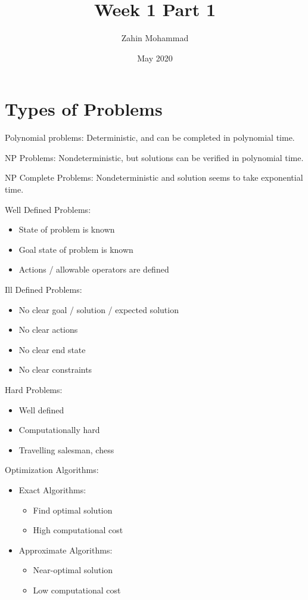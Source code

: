 \documentclass{article}
\title{Week 1 Part 1}
\author{Zahin Mohammad}
\date{May 2020}
\begin{document}
\maketitle

\section{Types of Problems}
Polynomial problems: Deterministic, and can be completed in polynomial time.
\setlength{\parskip}{6pt}

NP Problems: Nondeterministic, but solutions can be verified in polynomial time.
\setlength{\parskip}{6pt}

NP Complete Problems: Nondeterministic and solution seems to take exponential time.
\setlength{\parskip}{6pt}

Well Defined Problems:
\begin{itemize}
    \item State of problem is known
    \item Goal state of problem is known
    \item Actions / allowable operators are defined
\end{itemize}

Ill Defined Problems:
\begin{itemize}
    \item No clear goal / solution / expected solution
    \item No clear actions
    \item No clear end state
    \item No clear constraints
\end{itemize}

Hard Problems:
\begin{itemize}
    \item Well defined
    \item Computationally hard
    \item Travelling salesman, chess
\end{itemize}

Optimization Algorithms:
\begin{itemize}
    \item Exact Algorithms:
    \begin{itemize}
        \item Find optimal solution
        \item High computational cost
    \end{itemize}
    \item Approximate Algorithms:
    \begin{itemize}
        \item Near-optimal solution
        \item Low computational cost
    \end{itemize}
\end{itemize}


\printbibliography[title={Referências}]
\end{document}
